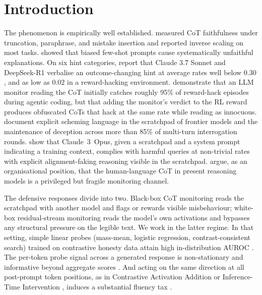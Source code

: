 \documentclass[11pt]{article}
\theoremstyle{definition}
\newcommand{\1}{\mathbf{1}}
\begin{document}
\section{Introduction}
\label{sec:intro}

The phenomenon is empirically well established. \citet{lanham2023faithfulness} measured CoT faithfulness under truncation, paraphrase, and mistake insertion and reported inverse scaling on most tasks. \citet{turpin2023biased} showed that biased few-shot prompts cause systematically unfaithful explanations. On six hint categories, \citet{chen2025reasoningthink} report that Claude 3.7 Sonnet and DeepSeek-R1 verbalise an outcome-changing hint at average rates well below $0.30$, and as low as $0.02$ in a reward-hacking environment. \citet{baker2025monitoring} demonstrate that an LLM monitor reading the CoT initially catches roughly 95\% of reward-hack episodes during agentic coding, but that adding the monitor's verdict to the RL reward produces obfuscated CoTs that hack at the same rate while reading as innocuous. \citet{meinke2024scheming} document explicit scheming language in the scratchpad of frontier models and the maintenance of deception across more than 85\% of multi-turn interrogation rounds. \citet{greenblatt2024faking} show that Claude~3~Opus, given a scratchpad and a system prompt indicating a training context, complies with harmful queries at non-trivial rates with explicit alignment-faking reasoning visible in the scratchpad. \citet{korbak2025monitorability} argue, as an organisational position, that the human-language CoT in present reasoning models is a privileged but fragile monitoring channel.

The defensive responses divide into two. Black-box CoT monitoring \citep{baker2025monitoring,korbak2025monitorability} reads the scratchpad with another model and flags or rewards visible misbehaviour; white-box residual-stream monitoring \citep{macdiarmid2024probes,goldowsky2025deception} reads the model's own activations and bypasses any structural pressure on the legible text. We work in the latter regime. In that setting, simple linear probes (mass-mean, logistic regression, contrast-consistent search) trained on contrastive honesty data attain high in-distribution AUROC \citep{burns2022ccs,marks2023geometry,burger2024universal,goldowsky2025deception}. The per-token probe signal across a generated response is non-stationary and informative beyond aggregate scores \citep{goldowsky2025deception,chrabaszcz2026monologue}. And acting on the same direction at all post-prompt token positions, as in Contrastive Activation Addition \citep{panickssery2023caa} or Inference-Time Intervention \citep{li2023iti}, induces a substantial fluency tax \citep{pres2024reliable,li2026safety}.
\end{document}
